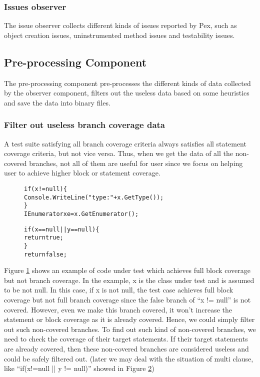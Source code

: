\subsubsection{Issues observer}
The issue observer collects different kinds of issues reported by Pex, such as object creation issues, uninstrumented method issues and testability issues.
\subsection{Pre-processing Component}
The pre-processing component pre-processes the different kinds of data collected by the observer component, filters out the useless data based on some heuristics and save the data into binary files.  
\subsubsection{Filter out useless branch coverage data}
A test suite satisfying all branch coverage criteria always satisfies all statement coverage criteria, but not vice versa. Thus, when we get the data of all the non-covered branches, not all of them are useful for user since we focus on helping user to achieve higher block or statement coverage. 
\begin{figure}
\begin{CodeOut}
\begin{alltt}
    if (x != null) \{ 	
  	   Console.WriteLine("type: " + x.GetType());
    \}
    IEnumerator xe = x.GetEnumerator();
\end{alltt}
\end{CodeOut}
\label{fig:useless1}
\end{figure}

\begin{figure}
\begin{CodeOut}
\begin{alltt}
    if (x == null || y == null) \{ 	
  	   return true;
    \}
    return false;
\end{alltt}
\end{CodeOut}
\label{fig:useless2}
\end{figure}
Figure \ref{fig:useless1} shows an example of code under test which achieves full block coverage but not branch coverage. In the example, x is the class under test and is assumed to be not null. In this case, if x is not null, the test case achieves full block coverage but not full branch coverage since the false branch of ``x != null'' is not covered. However, even we make this branch covered, it won't increase the statement or block coverage as it is already covered. Hence, we could simply filter out such non-covered branches. To find out such kind of non-covered branches, we need to check the coverage of their target statements. If their target statements are already covered, then these non-covered branches are considered useless and could be safely filtered out. (later we may deal with the situation of multi clause, like ``if(x!=null || y != null)'' showed in Figure \ref{fig:useless2})
